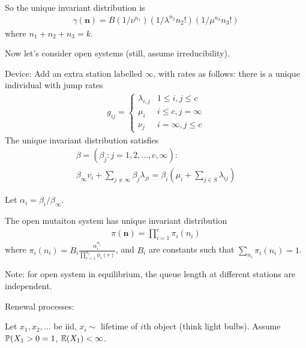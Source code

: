 \documentclass[a4paper]{article}
\begin{document}
So the unique invariant distribution is
\begin{equation*}
\begin{aligned}
\gamma(\mathbf{n}) = B(1/\nu^{n_1}) (1/\lambda^{n_2} n_2!) (1/\mu^{n_3} n_3!)
\end{aligned}
\end{equation*}
where $n_1+n_2+n_3 = k$.

Now let's consider open systems (still, assume irreducibility).

Device: Add an extra station labelled $\infty$, with rates as follows: there is a unique individual with jump rates
\begin{equation*}
\begin{aligned}
g_{ij} = \left\{\begin{array}{ll}
\lambda_{i,j} & 1 \leq i,j \leq c\\
\mu_i & i \leq c, j = \infty\\
\nu_j & i = \infty, j \leq c
\end{array}
\right.
\end{aligned}
\end{equation*}
The unique invariant distribution satisfies
\begin{equation*}
\begin{aligned}
\beta = (\beta_j:j=1,2,...,c,\infty):\\
\beta_\infty v_i + \sum_{j\neq \infty} \beta_j \lambda_{ji} = \beta_i(\mu_i+\sum_{j \in S} \lambda_{ij})
\end{aligned}
\end{equation*}

Let $\alpha_i = \beta_i/\beta_\infty$. 

\begin{thm}
The open mutaiton system has unique invariant distribution
\begin{equation*}
\begin{aligned}
\pi(\mathbf{n}) = \prod_{i=1}^c \pi_i(n_i)
\end{aligned}
\end{equation*}
where $\pi_i(n_i) = B_i \frac{\alpha_i^{n_i}}{\prod_{r=1}^{n_i} \phi_i(r)}$, and $B_i$ are constants such that $\sum_{n_i} \pi_i (n_i) = 1$.
\end{thm}

Note: for open system in equilibrium, the queue length at different stations are independent.

Renewal processes:

Let $x_1,x_2,...$ be iid, $x_i \sim$ lifetime of $i$th object (think light bulbs). Assume $\P(X_1 > 0 = 1$, $\E(X_1) < \infty$.
\end{document}
